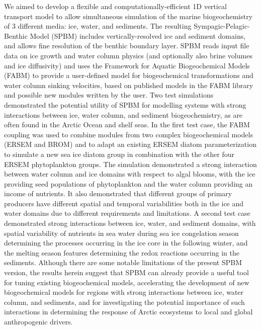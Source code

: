\documentclass[gmd, manuscript]{copernicus}
\begin{document}
\conclusions  %

We aimed to develop a flexible and computationally-efficient 1D vertical transport model to allow simultaneous simulation of the marine biogeochemistry of 3 different media: ice, water, and sediments.
The resulting Sympagic-Pelagic-Benthic Model (\textrm{SPBM}) includes vertically-resolved ice and sediment domains, and allows fine resolution of the benthic boundary layer.
\textrm{SPBM} reads input file data on ice growth and water column physics (and optionally also brine volumes and ice diffusivity) and uses the Framework for Aquatic Biogeochemical Models (\textrm{FABM}) to provide a user-defined model for biogeochemical transformations and water column sinking velocities, based on published models in the \textrm{FABM} library and possible new modules written by the user.
Two test simulations demonstrated the potential utility of \textrm{SPBM} for modelling systems with strong interactions between ice, water column, and sediment biogeochemistry, as are often found in the Arctic Ocean and shelf seas.
In the first test case, the \textrm{FABM} coupling was used to combine modules from two complex biogeochemical models (\textrm{ERSEM} and \textrm{BROM}) and to adapt an existing \textrm{ERSEM} diatom parameterization to simulate a new sea ice diatom group in combination with the other four \textrm{ERSEM} phytoplankton groups.
The simulation demonstrated a strong interaction between water column and ice domains with respect to algal blooms, with the ice providing seed populations of phytoplankton and the water column providing an income of nutrients.
It also demonstrated that different groups of primary producers have different spatial and temporal variabilities both in the ice and water domains due to different requirements and limitations.
A second test case demonstrated strong interactions between ice, water, and sediment domains, with spatial variability of nutrients in sea water during sea ice congelation season determining the processes occurring in the ice core in the following winter, and the melting season features determining the redox reactions occurring in the sediments.
Although there are some notable limitations of the present \textrm{SPBM} version, the results herein suggest that \textrm{SPBM} can already provide a useful tool for tuning existing biogeochemical models, accelerating the development of new biogeochemical models for regions with strong interactions between ice, water column, and sediments, and for investigating the potential importance of such interactions in determining the response of Arctic ecosystems to local and global anthropogenic drivers.
\end{document}
